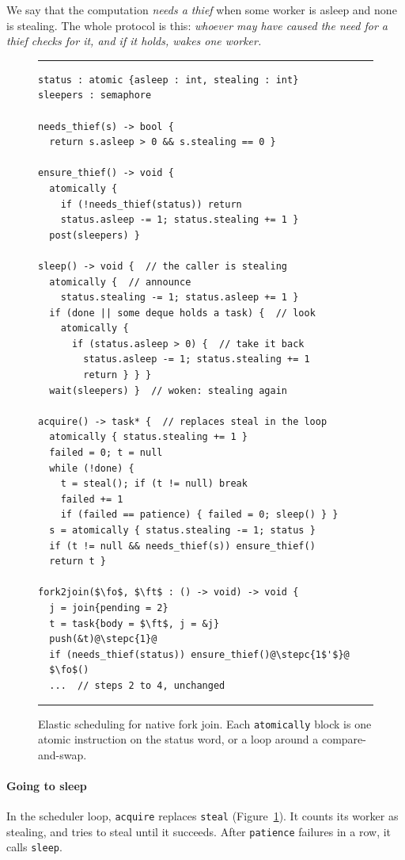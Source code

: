 \documentclass[sigplan,nonacm]{acmart}
\newcommand{\fo}{\mathtt{f_1}}
\newcommand{\ft}{\mathtt{f_2}}
\newcommand{\stepc}[1]{\hfill{\rmfamily\slshape // (#1)}}
\begin{document}
We say that the computation \emph{needs a thief} when some worker is
asleep and none is stealing.
%
The whole protocol is this: \emph{whoever may have caused the need
for a thief checks for it, and if it holds, wakes one worker.}

\begin{figure}
\hrule
\begin{lstlisting}[escapechar=@]
status : atomic {asleep : int, stealing : int}
sleepers : semaphore

needs_thief(s) -> bool {
  return s.asleep > 0 && s.stealing == 0 }

ensure_thief() -> void {
  atomically {
    if (!needs_thief(status)) return
    status.asleep -= 1; status.stealing += 1 }
  post(sleepers) }

sleep() -> void {  // the caller is stealing
  atomically {  // announce
    status.stealing -= 1; status.asleep += 1 }
  if (done || some deque holds a task) {  // look
    atomically {
      if (status.asleep > 0) {  // take it back
        status.asleep -= 1; status.stealing += 1
        return } } }
  wait(sleepers) }  // woken: stealing again

acquire() -> task* {  // replaces steal in the loop
  atomically { status.stealing += 1 }
  failed = 0; t = null
  while (!done) {
    t = steal(); if (t != null) break
    failed += 1
    if (failed == patience) { failed = 0; sleep() } }
  s = atomically { status.stealing -= 1; status }
  if (t != null && needs_thief(s)) ensure_thief()
  return t }

fork2join($\fo$, $\ft$ : () -> void) -> void {
  j = join{pending = 2}
  t = task{body = $\ft$, j = &j}
  push(&t)@\stepc{1}@
  if (needs_thief(status)) ensure_thief()@\stepc{1$'$}@
  $\fo$()
  ...  // steps 2 to 4, unchanged
\end{lstlisting}
\hrule
\caption{Elastic scheduling for native fork join.  Each
  \lstinline|atomically| block is one atomic instruction on the status
  word, or a loop around a compare-and-swap.}
\label{fig:elastic}
\end{figure}

\paragraph{Going to sleep}
%
In the scheduler loop, \lstinline|acquire| replaces
\lstinline|steal| (Figure~\ref{fig:elastic}).
%
It counts its worker as stealing, and tries to steal until it
succeeds.
%
After \lstinline|patience| failures in a row, it calls
\lstinline|sleep|.
\end{document}
